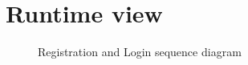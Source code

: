 \section{Runtime view}
\label{RuntimeView}


\begin{figure}[H]
    \centering
    \caption{Registration and Login sequence diagram}
    \label{fig:log&regDiagram}
\end{figure}

